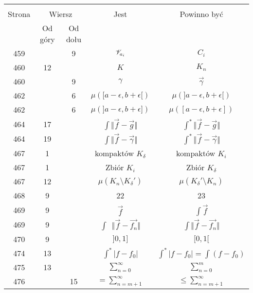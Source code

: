 \documentclass[a4paper,11pt]{article}
\begin{document}
\begin{center}

  \begin{tabular}{|c|c|c|c|c|}
    \hline
    & \multicolumn{2}{c|}{} & & \\
    Strona & \multicolumn{2}{c|}{Wiersz} & Jest
                              & Powinno być \\ \cline{2-3}
    & Od góry & Od dołu & & \\
    \hline
    459 & &  9 & $\mathcal{V}_{ a_{ i } }$ & $C_{ i }$ \\
    460 & 12 & & $K$ & $K_{ n }$ \\
    460 & &  9 & $\gamma$ & $\vec{ \gamma }$ \\
    462 & &  6 & $\mu( [ a - \epsilon, b + \epsilon [ )$
           & $\mu( ] a - \epsilon, b + \epsilon [ )$ \\
    462 & &  6 & $\mu( ] a - \epsilon, b + \epsilon ] )$
           & $\mu( [ a - \epsilon, b + \epsilon ] )$ \\
    464 & 17 & & $\int \Vert \vec{ f } - \vec{ g } \Vert$
           & $\int^{ * } \Vert \vec{ f } - \vec{ g } \Vert$ \\
    464 & 19 & & $\int \Vert \vec{ f } - \vec{ \gamma } \Vert$
           & $\int^{ * } \Vert \vec{ f } - \vec{ \gamma } \Vert$ \\
    467 &  1 & & kompaktów $K_{ \delta }$ & kompaktów $K_{ i }$ \\
    467 &  1 & & Zbiór $K_{ i }$ & Zbiór $K_{ \delta }$ \\
    467 & 12 & & $\mu( K_{ n } \setminus K_{ \delta }' )$
           & $\mu( K_{ \delta }' \setminus K_{ n } )$ \\
    468 &  9 & & 22 & 23 \\
    469 &  9 & & $\vec{ f }$ & $\int \vec{ f }$ \\
    469 &  9 & & $\int\:\; \Vert \vec{ f } - \vec{ f_{ n } } \Vert$
           & $\int \Vert \vec{ f } - \vec{ f_{ n } } \Vert$ \\
    470 &  9 & & $] 0, 1 ]$ & $[ 0, 1 [$ \\
    474 & 13 & & $\int^{ * } | f - f_{ 0 } |$
           & $\int^{ * } | f - f_{ 0 } | = \int ( f - f_{ 0 } )$ \\
    475 & 13 & &  $\sum_{ n = 0 }^{ \infty }$ & $\sum_{ n = 0 }^{ m }$ \\
    476 & & 15 & $= \sum^{ \infty }_{ n = m + 1 }$
           & $\leq \sum^{ \infty }_{ n = m + 1 }$ \\

\end{tabular}
\end{center}
\end{document}
